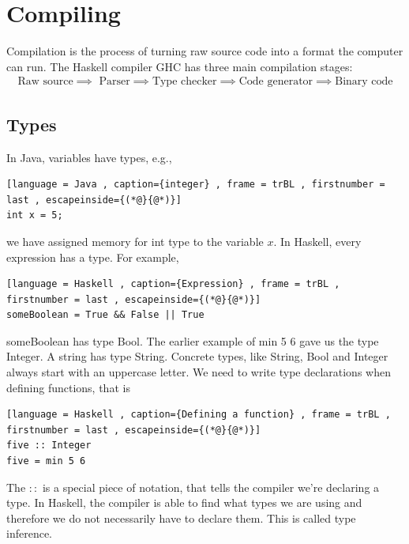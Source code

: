 \documentclass[a4paper]{article}
\theoremstyle{plain}
\theoremstyle{definition}
\theoremstyle{remark}
\begin{document}
\section{Compiling}
Compilation is the process of turning raw source code into a format the computer can run. The Haskell compiler GHC has three main compilation stages:
\begin{align*}
	\text{Raw source} \implies \text{ Parser} \implies \text{Type checker} \implies \text{Code generator} \implies \text{Binary code}
\end{align*}
\subsection{Types}
In Java, variables have types, e.g.,
\begin{lstlisting}[language = Java , caption={integer} , frame = trBL , firstnumber = last , escapeinside={(*@}{@*)}]
int x = 5;
\end{lstlisting}
we have assigned memory for int type to the variable $x$. In Haskell, every expression has a type. For example,
\begin{lstlisting}[language = Haskell , caption={Expression} , frame = trBL , firstnumber = last , escapeinside={(*@}{@*)}]
someBoolean = True && False || True
\end{lstlisting}
someBoolean has type Bool. The earlier example of  min 5 6 gave us the type Integer. A string has type String.  Concrete types, like String, Bool and Integer always start with an uppercase letter. We need to write type declarations when defining functions, that is
\begin{lstlisting}[language = Haskell , caption={Defining a function} , frame = trBL , firstnumber = last , escapeinside={(*@}{@*)}]
five :: Integer
five = min 5 6
\end{lstlisting}
The $::$ is a special piece of notation, that tells the compiler we're declaring a type. In Haskell, the compiler is able to find what types we are using and therefore we do not necessarily have to declare them. This is called type inference. 
\end{document}
